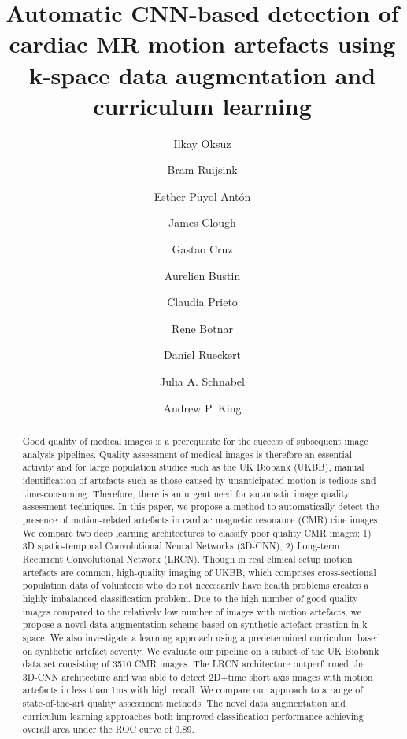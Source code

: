 \documentclass[preprint,12pt,authoryear]{elsarticle}
\begin{document}
\begin{frontmatter}
\title{Automatic CNN-based detection of cardiac MR motion artefacts using k-space data augmentation and curriculum learning}

\author[KCL]{Ilkay Oksuz}

\author[KCL,NHS]{Bram Ruijsink}
\author[KCL]{Esther Puyol-Ant\'on}
\author[KCL]{James Clough}
\author[KCL]{Gastao Cruz}
\author[KCL]{Aurelien Bustin}
\author[KCL]{Claudia Prieto}
\author[KCL]{Rene Botnar}
\author[Imperial]{Daniel Rueckert}
\author[KCL]{Julia A. Schnabel}
\author[KCL]{Andrew P. King}

\address[KCL]{School of Biomedical Engineering \& Imaging Sciences, King\textquotesingle s College London, U.K}
\address[NHS]{Guy\textquotesingle s and St Thomas\textquotesingle{} Hospital NHS Foundation Trust, London, UK.}
\address[Imperial]{Biomedical Image Analysis Group, Imperial College London, UK.}



\begin{abstract}

Good quality of medical images is a prerequisite for the success of subsequent image analysis pipelines. Quality assessment of medical images is therefore an essential activity and for large population studies such as the UK Biobank (UKBB), manual identification of artefacts such as those caused by unanticipated motion is tedious and time-consuming. Therefore, there is an urgent need for automatic image quality assessment techniques. In this paper, we propose a method to automatically detect the presence of motion-related artefacts in cardiac magnetic resonance (CMR) cine images. We compare two deep learning architectures to classify poor quality CMR images: 1) 3D spatio-temporal Convolutional Neural Networks (3D-CNN), 2) Long-term Recurrent Convolutional Network  (LRCN). Though in real clinical setup motion artefacts are common, high-quality imaging of UKBB, which comprises cross-sectional population data of volunteers who do not necessarily have health problems creates a highly imbalanced classification problem. Due to the high number of good quality images compared to the relatively low number of images with motion artefacts, we propose a novel data augmentation scheme based on synthetic artefact creation in k-space. We also investigate a learning approach using a predetermined curriculum based on synthetic artefact severity. We evaluate our pipeline on a subset of the UK Biobank data set consisting of 3510 CMR images. The LRCN architecture outperformed the 3D-CNN architecture and was able to detect 2D+time short axis images with motion artefacts in less than 1ms with high recall. We compare our approach to a range of state-of-the-art quality assessment methods.  The novel data augmentation and curriculum learning approaches both improved classification performance achieving overall area under the ROC curve of 0.89.


\end{abstract}
\end{frontmatter}
\end{document}
